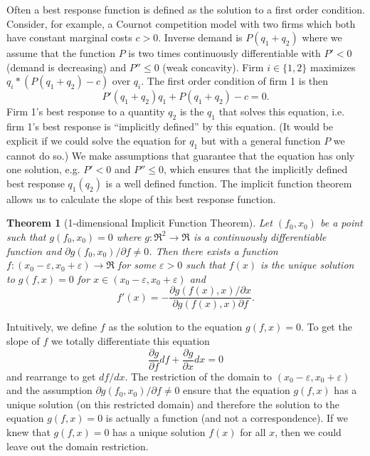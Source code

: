 \documentclass[a4paper,12pt]{article}
\newtheorem{theorem}{Theorem}
\begin{document}
Often a best response function is defined as the solution to a first order condition.
Consider, for example, a Cournot competition model with two firms which both have constant marginal costs $c>0$. Inverse demand is $P(q_1+q_2)$ where we assume that the function $P$ is two times continuously differentiable with $P'<0$ (demand is decreasing) and $P''\leq 0$ (weak concavity). Firm $i\in\{1,2\}$ maximizes $q_i*(P(q_1+q_2)-c)$ over $q_i$. The first order condition of firm 1 is then
\begin{equation*}
  P'(q_1+q_2)q_1+P(q_1+q_2)-c=0.
\end{equation*}
Firm 1's best response to a quantity $q_2$ is the $q_1$ that solves this equation, i.e. firm 1's best response is ``implicitly defined'' by this equation. (It would be explicit if we could solve the equation for $q_1$ but with a general function $P$ we cannot do so.) We make assumptions that guarantee that the equation has only one solution, e.g. $P'<0$ and $P''\leq 0$, which ensures that the implicitly defined best response $q_1(q_2)$ is a well defined function. The implicit function theorem allows us to calculate the slope of this best response function.

\begin{theorem}[1-dimensional Implicit Function Theorem]
  Let $(f_0,x_0)$ be a point such that $g(f_0,x_0)=0$ where $g:\Re^2\rightarrow\Re$ is a continuously differentiable function and $\partial g(f_0,x_0)/\partial f\neq 0$. Then there exists a function $f:(x_0-\varepsilon ,x_0+\varepsilon )\rightarrow\Re$ for some $\varepsilon >0$ such that $f(x)$ is the unique solution to $g(f,x)=0$ for $x\in(x_0-\varepsilon ,x_0+\varepsilon )$ and
  \begin{equation*}
    f'(x)=-\frac{\partial g(f(x),x)/\partial x}{\partial g(f(x),x)\partial f}.
  \end{equation*}
\end{theorem}

Intuitively, we define $f$ as the solution to the equation $g(f,x)=0$. To get the slope of $f$ we totally differentiate this equation
\begin{equation*}
  \frac{\partial g}{\partial f}df+\frac{\partial g}{\partial x}dx=0
\end{equation*}
and rearrange to get $df/dx$. The restriction of the domain to $(x_0-\varepsilon, x_0+\varepsilon )$ and the assumption $\partial g(f_0,x_0)/\partial f\neq 0$ ensure that the equation $g(f,x)$ has a unique solution (on this restricted domain) and therefore the solution to the equation $g(f,x)=0$ is  actually  a function (and not a correspondence). If we knew that $g(f,x)=0$ has a unique solution $f(x)$ for all $x$, then we could leave out the domain restriction.
\end{document}
